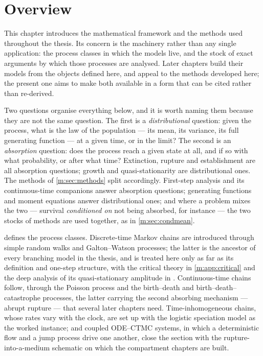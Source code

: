 \section{Overview}
\label{m:sec:overview}

This chapter introduces the mathematical framework and the methods used
throughout the thesis. Its concern is the machinery rather than any single
application: the process classes in which the models live, and the stock of
exact arguments by which those processes are analysed. Later chapters build
their models from the objects defined here, and appeal to the methods developed
here; the present one aims to make both available in a form that can be cited
rather than re-derived.

Two questions organise everything below, and it is worth naming them because
they are not the same question. The first is a \emph{distributional} question:
given the process, what is the law of the population --- its mean, its variance,
its full generating function --- at a given time, or in the limit? The second is
an \emph{absorption} question: does the process reach a given state at all, and
if so with what probability, or after what time? Extinction, rupture and
establishment are all absorption questions; growth and quasi-stationarity are
distributional ones. The methods of \cref{m:sec:methods} split accordingly.
First-step analysis and its continuous-time companions answer absorption
questions; generating functions and moment equations answer distributional ones;
and where a problem mixes the two --- survival \emph{conditioned on} not being
absorbed, for instance --- the two stocks of methods are used together, as in
\cref{m:sec:condmean}.

 defines the process classes. Discrete-time Markov chains are
introduced through simple random walks and Galton--Watson processes; the latter
is the ancestor of every branching model in the thesis, and is treated here only
as far as its definition and one-step structure, with the critical theory in
\cref{m:app:critical} and the deep analysis of its quasi-stationary amplitude
in \ChA. Continuous-time chains follow, through the Poisson process and the
birth--death and birth--death--catastrophe processes, the latter carrying the
second absorbing mechanism --- abrupt rupture --- that several later chapters
need. Time-inhomogeneous chains, whose rates vary with the clock, are set up
with the logistic speciation model as the worked instance; and coupled
ODE--CTMC systems, in which a deterministic flow and a jump process drive one
another, close the section with the rupture-into-a-medium schematic on which the
compartment chapters are built.

